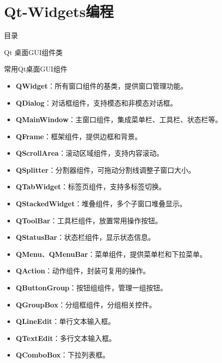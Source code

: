 \documentclass[UTF8,aspectratio=169]{beamer}
\begin{document}
\section{Qt-Widgets编程}
\begin{frame}{目录}
    \begin{multicols}{2}
        \tableofcontents[currentsection]
    \end{multicols}
\end{frame}


\begin{frame}{Qt 桌面GUI组件类}
    \begin{ytublock}{常用Qt桌面GUI组件}
        {\scriptsize
        \begin{multicols}{2}
        \begin{itemize}
            \item \textbf{QWidget}：所有窗口组件的基类，提供窗口管理功能。
            \item \textbf{QDialog}：对话框组件，支持模态和非模态对话框。
            \item \textbf{QMainWindow}：主窗口组件，集成菜单栏、工具栏、状态栏等。
            \item \textbf{QFrame}：框架组件，提供边框和背景。
            \item \textbf{QScrollArea}：滚动区域组件，支持内容滚动。
            \item \textbf{QSplitter}：分割器组件，可拖动分割线调整子窗口大小。
            \item \textbf{QTabWidget}：标签页组件，支持多标签切换。
            \item \textbf{QStackedWidget}：堆叠组件，多个子窗口堆叠显示。
            \item \textbf{QToolBar}：工具栏组件，放置常用操作按钮。
            \item \textbf{QStatusBar}：状态栏组件，显示状态信息。
            \item \textbf{QMenu}、\textbf{QMenuBar}：菜单组件，提供菜单栏和下拉菜单。
            \item \textbf{QAction}：动作组件，封装可复用的操作。
            \item \textbf{QButtonGroup}：按钮组组件，管理一组按钮。
            \item \textbf{QGroupBox}：分组框组件，分组相关控件。
            \item \textbf{QLineEdit}：单行文本输入框。
            \item \textbf{QTextEdit}：多行文本输入框。
            \item \textbf{QComboBox}：下拉列表框。

\end{itemize}
\end{multicols}}
\end{ytublock}
\end{frame}
\end{document}
